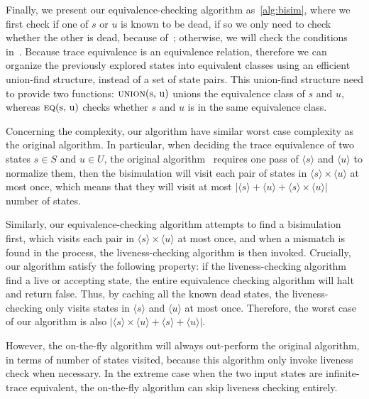 \documentclass[conference]{IEEEtran}
\begin{document}
Finally, we present our equivalence-checking algorithm as~\cref{alg:bisim}, where we first check if one of \(s\) or \(u\) is known to be dead, if so we only need to check whether the other is dead, because of~; otherwise, we will check the conditions in~.
Because trace equivalence is an equivalence relation, therefore we can organize the previously explored states into equivalent classes using an efficient union-find structure, instead of a set of state pairs.
This union-find structure need to provide two functions: \(\Call{union}{$s, u$}\) unions the equivalence class of \(s\) and \(u\), whereas \(\Call{eq}{$s, u$}\) checks whether \(s\) and \(u\) is in the same equivalence class. 

Concerning the complexity, our algorithm have similar worst case complexity as the original algorithm.
In particular, when deciding the trace equivalence of two states \(s ∈ S\) and \(u ∈ U\), the original algorithm~\cite{smolka_GuardedKleeneAlgebra_2020} requires one pass of \(⟨s⟩\) and \(⟨u⟩\) to normalize them, then the bisimulation will visit each pair of states in \(⟨s⟩ × ⟨u⟩\) at most once, which means that they will visit at most \(|⟨s⟩ + ⟨u⟩ + ⟨s⟩ × ⟨u⟩|\) number of states.

Similarly, our equivalence-checking algorithm attempts to find a bisimulation first, which visits each pair in \(⟨s⟩ × ⟨u⟩\) at most once, and when a mismatch is found in the process, the liveness-checking algorithm is then invoked.
Crucially, our algorithm satisfy the following property: if the liveness-checking algorithm find a live or accepting state, the entire equivalence checking algorithm will halt and return false.
Thus, by caching all the known dead states, the liveness-checking only visits states in \(⟨s⟩\) and \(⟨u⟩\) at most once.
Therefore, the worst case of our algorithm is also \(|⟨s⟩ × ⟨u⟩ + ⟨s⟩ + ⟨u⟩|\).

However, the on-the-fly algorithm will always out-perform the original algorithm, in terms of number of states visited, because this algorithm only invoke liveness check when necessary.
In the extreme case when the two input states are infinite-trace equivalent, the on-the-fly algorithm can skip liveness checking entirely.



\end{document}
